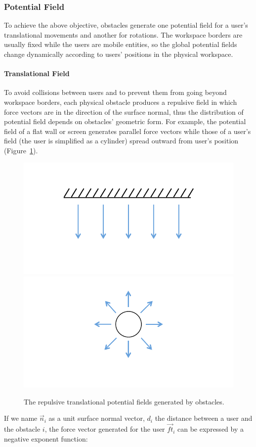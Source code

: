 \subsubsection{Potential Field}
To achieve the above objective, obstacles generate one potential field for a user's translational movements and another for rotations. The workspace borders are usually fixed while the users are mobile entities, so the global potential fields change dynamically according to users' positions in the physical workspace.

\paragraph{Translational Field}
To avoid collisions between users and to prevent them from going beyond workspace borders, each physical obstacle produces a repulsive field in which force vectors are in the direction of the surface normal, thus the distribution of potential field depends on obstacles' geometric form. For example, the potential field of a flat wall or screen generates parallel force vectors while those of a user's field (the user is simplified as a cylinder) spread outward from user's position (Figure~\ref{fig:5_pf_t}).

\begin{figure}[htb]
  \centering
  \includegraphics[width=.49\textwidth]{figures/ch5/pf_t_wall}
  \includegraphics[width=.49\textwidth]{figures/ch5/pf_t_user}
  \caption{\label{fig:5_pf_t}The repulsive translational potential fields generated by obstacles.}
\end{figure}

If we name $\overrightarrow{n}_{i}$ as a unit surface normal vector, $d_{i}$ the distance between a user and the obstacle $i$, the force vector generated for the user $\overrightarrow{ft}_{i}$ can be expressed by a negative exponent function:

